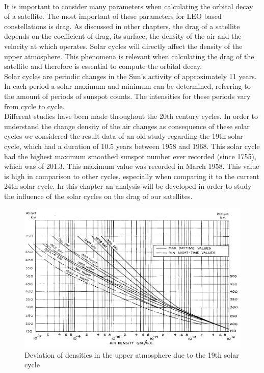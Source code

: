 \paragraph{ }

It is important to consider many parameters when calculating the orbital decay of a satellite. The most important of these parameters for LEO based constellations is drag. As discussed in other chapters, the drag of a satellite depends on the coefficient of drag, its surface, the density of the air and the velocity at which operates. Solar cycles will directly affect the density of the upper atmosphere. This phenomena is relevant when calculating the drag of the satellite and therefore is essential to compute the orbital decay. \\

Solar cycles are periodic changes in the Sun's activity of approximately 11 years. In each period a solar maximum and minimum can be determined, referring to the amount of periods of sunspot counts. The intensities for these periods vary from cycle to cycle. \\



Different studies have been made throughout the 20th century cycles. In order to understand the change  density of the air changes as consequence of these solar cycles we considered the result data of an old study regarding the 19th solar cycle, which had a duration of 10.5 years between 1958 and 1968. This solar cycle had the highest maximum smoothed sunspot number ever recorded (since 1755), which was of 201.3. This maximum value was recorded in March 1958. This value is high in comparison to other cycles, especially when comparing it to the current 24th solar cycle. In this chapter an analysis will be developed in order to study the influence of the solar cycles on the drag of our satellites. 



\begin{figure}[h]
\includegraphics[width=14cm]{solarcycles}
\centering
\caption{Deviation of densities in the upper atmosphere due to the 19th solar cycle}
\end{figure}


